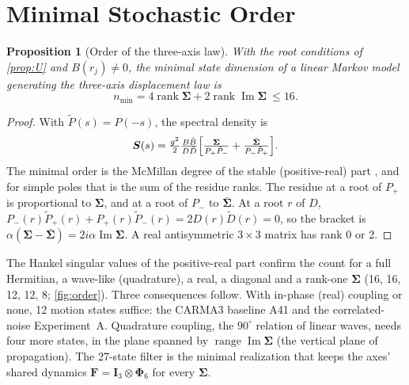 \documentclass[conference]{IEEEtran}
\DeclareRobustCommand{\mat}[1]{\bm{#1}}
\renewcommand{\Im}{\operatorname{Im}}
\theoremstyle{bodysmall}
\newtheorem{proposition}{Proposition}
\begin{document}
\section{Minimal Stochastic Order}
\label{sec:order}
\begin{proposition}[Order of the three-axis law]
\label{prop:order}
With the root conditions of \cref{prop:U} and $B(r_j)\neq0$, the minimal
state dimension of a linear Markov model generating the three-axis
displacement law is
\begin{equation}
n_{\min}=4\operatorname{rank}\mat\Sigma+2\operatorname{rank}\Im\mat\Sigma\ \le 16.
\end{equation}
\end{proposition}
\begin{proof}
With $\tilde P(s)=P(-s)$, the spectral density is
\begin{equation*}
\mat S(s)=\tfrac{g^2}{2}\tfrac{B\tilde B}{D\tilde D}
\Bigl[\tfrac{\mat\Sigma}{P_+\tilde P_-}+\tfrac{\bar{\mat\Sigma}}{P_-\tilde P_+}\Bigr].
\end{equation*}
The minimal order is the McMillan degree of the stable (positive-real)
part \cite{faurre79,lindquist15}, and for simple poles that is the sum of
the residue ranks. The residue at a root of $P_+$ is proportional to
$\mat\Sigma$, and at a root of $P_-$ to $\bar{\mat\Sigma}$. At a root $r$ of $D$,
$P_-(r)\tilde P_+(r)+P_+(r)\tilde P_-(r)=2D(r)\tilde D(r)=0$, so the bracket
is $\alpha(\mat\Sigma-\bar{\mat\Sigma})=2i\alpha\Im\mat\Sigma$. A real
antisymmetric $3\times3$ matrix has rank 0 or 2.
\end{proof}
The Hankel singular values of the positive-real part confirm the count for
a full Hermitian, a wave-like (quadrature), a real, a diagonal and a rank-one
$\mat\Sigma$ (16, 16, 12, 12, 8; \cref{fig:order}). Three consequences
follow. With in-phase (real) coupling or none, 12 motion states suffice: the
CARMA3 baseline A41 and the correlated-noise Experiment~A. Quadrature
coupling, the $90^\circ$ relation of linear waves, needs four more states, in
the plane spanned by $\operatorname{range}\Im\mat\Sigma$ (the vertical plane
of propagation). The 27-state filter is the minimal realization that keeps
the axes' shared dynamics $\mat F=\mat I_3\otimes\mat\Phi_6$ for every
$\mat\Sigma$.
\end{document}
